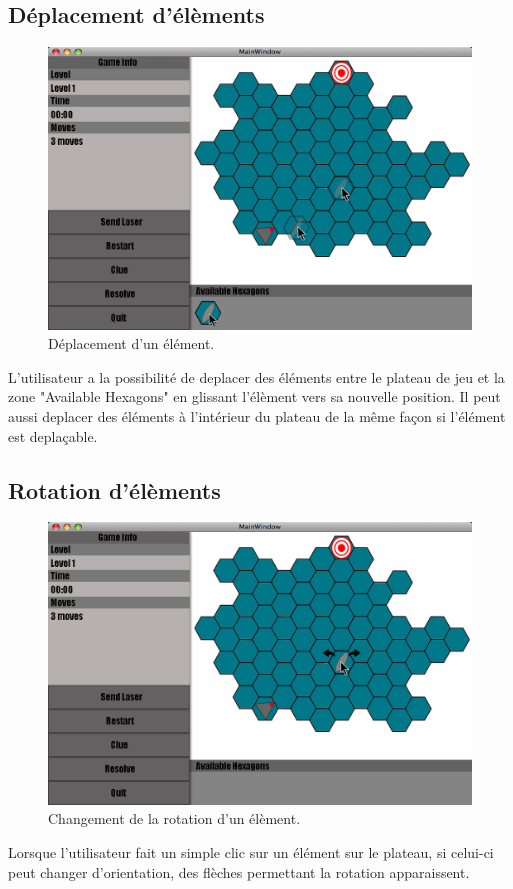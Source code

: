 \documentclass[]{article}
\begin{document}
\subsection{Déplacement d'élèments }\label{sec:game2}
\begin{figure}[!htb]
\begin{center}
  \includegraphics[width=\textwidth]{Game2.png}
  \caption{Déplacement d'un élément.}\label{fig:game2}
\end{center}
\end{figure}
L'utilisateur a la possibilité de deplacer des éléments entre le plateau de jeu et la zone "Available Hexagons" en glissant l'élèment vers sa nouvelle position.
Il peut aussi deplacer des éléments à l'intérieur du plateau de la même façon si l'élément est deplaçable.
\newpage
\subsection{Rotation d'élèments }\label{sec:game3}
\begin{figure}[!htb]
\begin{center}
  \includegraphics[width=\textwidth]{Game3.png}
  \caption{Changement de la rotation d'un élèment.}\label{fig:game3}
\end{center}
\end{figure}
Lorsque l'utilisateur fait un simple clic sur un élément sur le plateau, si celui-ci peut changer d'orientation, des flèches permettant la rotation apparaissent.
\newpage
\end{document}
